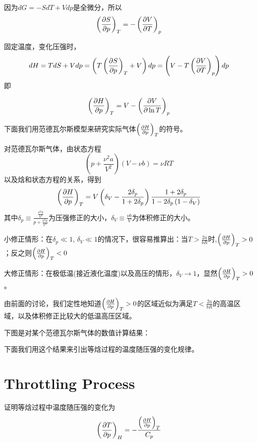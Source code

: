 \documentclass[CJK]{beamer}
\begin{document}
\begin{frame}
\bch
因为$d G = - SdT + Vdp$是全微分，所以
{\blue
$$ \left(\frac{\partial S}{\partial p}\right)_{T} = - \left(\frac{\partial V}{\partial T}\right)_{p}$$
}

固定温度，变化压强时，
$$ dH = TdS + Vdp = \left( T\left(\frac{\partial S}{\partial p}\right)_{T} + V\right) dp = \left( V - T\left(\frac{\partial V}{\partial T}\right)_{p}\right) dp$$
即

{\blue
$$\left(\frac{\partial H}{\partial p}\right)_{T} = V - \left(\frac{\partial V}{\partial \ln T}\right)_{p}$$  
}

下面我们用范德瓦尔斯模型来研究实际气体$\left(\frac{\partial H}{\partial p}\right)_{T}$的符号。

\ech
\end{frame}



\begin{frame}
\bch
{\small

对范德瓦尔斯气体，由状态方程
$$\left(p + \frac{\nu^2 a}{V^2}\right) \left(V - \nu b\right) = \nu RT$$
以及焓和状态方程的关系，得到
$$\left(\frac{\partial H}{\partial p}\right)_{T} = V \left(\delta_V - \frac{2\delta_p}{1+2\delta_p}\right) \frac{1+2\delta_p}{1-2\delta_p\left(1-\delta_V\right)}$$
其中$\delta_p \equiv \frac{\frac{\nu^2a}{V^2}}{p+\frac{\nu^2 a}{V^2}}$为压强修正的大小，$\delta_V\equiv \frac{\nu b}{V}$为体积修正的大小。

\bitem
\item{小修正情形：在$\delta_p \ll 1$, $\delta_V \ll 1$的情况下，很容易推算出：当$T>\frac{2a}{bR}$时,$\left(\frac{\partial H}{\partial p}\right)_{T}>0$；反之则$\left(\frac{\partial H}{\partial p}\right)_{T}<0$}
\item{大修正情形：在极低温(接近液化温度)以及高压的情形，$\delta_V\rightarrow 1$，显然$\left(\frac{\partial H}{\partial p}\right)_{T}>0$。}
\eitem

}
\ech
\end{frame}



\begin{frame}
\bch
由前面的讨论，我们定性地知道$\left(\frac{\partial H}{\partial p}\right)_{T}>0$的区域近似为满足$T<\frac{2a}{bR}$的高温区域，以及体积修正比较大的低温高压区域。

下图是对某个范德瓦尔斯气体的数值计算结果：

下面我们用这个结果来引出等焓过程的温度随压强的变化规律。
\ech
\end{frame}


\section{Throttling Process}


\begin{frame}
\bch
{}
证明等焓过程中温度随压强的变化为
{\blue
$$\left(\frac{\partial T}{\partial p}\right)_{H} = - \frac{\left(\frac{\partial H}{\partial p}\right)_{T}}{C_p}$$
}
\ech
\end{frame}
\end{document}
